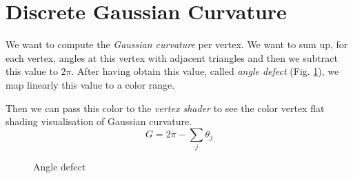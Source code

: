 \section{Discrete Gaussian Curvature}
\label{section:vertex-area-gaussian-curvature}
We want to compute the \textit{Gaussian curvature} per vertex. We want to sum up, for each vertex, angles at this vertex with adjacent triangles and then we subtract this value to $2\pi$.
After having obtain this value, called \textit{angle defect} (Fig. \ref{fig:gc-angle}), we map linearly this value to a color range.

Then we can pass this color to the \textit{vertex shader} to see the color vertex flat shading visualisation of Gaussian curvature.
$$G = 2\pi - \sum_j \theta_j$$
\begin{figure}[!h]
    \centering
    \caption{Angle defect}\label{fig:gc-angle}
\end{figure}

